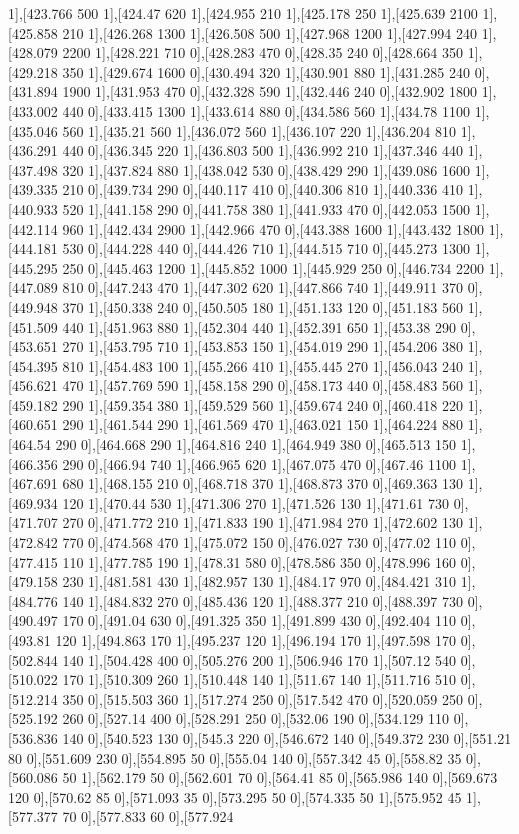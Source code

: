 {1],[423.766 500 1],[424.47 620 1],[424.955 210 1],[425.178 250 1],[425.639 2100 1],[425.858 210 1],[426.268 1300 1],[426.508 500 1],[427.968 1200 1],[427.994 240 1],[428.079 2200 1],[428.221 710 0],[428.283 470 0],[428.35 240 0],[428.664 350 1],[429.218 350 1],[429.674 1600 0],[430.494 320 1],[430.901 880 1],[431.285 240 0],[431.894 1900 1],[431.953 470 0],[432.328 590 1],[432.446 240 0],[432.902 1800 1],[433.002 440 0],[433.415 1300 1],[433.614 880 0],[434.586 560 1],[434.78 1100 1],[435.046 560 1],[435.21 560 1],[436.072 560 1],[436.107 220 1],[436.204 810 1],[436.291 440 0],[436.345 220 1],[436.803 500 1],[436.992 210 1],[437.346 440 1],[437.498 320 1],[437.824 880 1],[438.042 530 0],[438.429 290 1],[439.086 1600 1],[439.335 210 0],[439.734 290 0],[440.117 410 0],[440.306 810 1],[440.336 410 1],[440.933 520 1],[441.158 290 0],[441.758 380 1],[441.933 470 0],[442.053 1500 1],[442.114 960 1],[442.434 2900 1],[442.966 470 0],[443.388 1600 1],[443.432 1800 1],[444.181 530 0],[444.228 440 0],[444.426 710 1],[444.515 710 0],[445.273 1300 1],[445.295 250 0],[445.463 1200 1],[445.852 1000 1],[445.929 250 0],[446.734 2200 1],[447.089 810 0],[447.243 470 1],[447.302 620 1],[447.866 740 1],[449.911 370 0],[449.948 370 1],[450.338 240 0],[450.505 180 1],[451.133 120 0],[451.183 560 1],[451.509 440 1],[451.963 880 1],[452.304 440 1],[452.391 650 1],[453.38 290 0],[453.651 270 1],[453.795 710 1],[453.853 150 1],[454.019 290 1],[454.206 380 1],[454.395 810 1],[454.483 100 1],[455.266 410 1],[455.445 270 1],[456.043 240 1],[456.621 470 1],[457.769 590 1],[458.158 290 0],[458.173 440 0],[458.483 560 1],[459.182 290 1],[459.354 380 1],[459.529 560 1],[459.674 240 0],[460.418 220 1],[460.651 290 1],[461.544 290 1],[461.569 470 1],[463.021 150 1],[464.224 880 1],[464.54 290 0],[464.668 290 1],[464.816 240 1],[464.949 380 0],[465.513 150 1],[466.356 290 0],[466.94 740 1],[466.965 620 1],[467.075 470 0],[467.46 1100 1],[467.691 680 1],[468.155 210 0],[468.718 370 1],[468.873 370 0],[469.363 130 1],[469.934 120 1],[470.44 530 1],[471.306 270 1],[471.526 130 1],[471.61 730 0],[471.707 270 0],[471.772 210 1],[471.833 190 1],[471.984 270 1],[472.602 130 1],[472.842 770 0],[474.568 470 1],[475.072 150 0],[476.027 730 0],[477.02 110 0],[477.415 110 1],[477.785 190 1],[478.31 580 0],[478.586 350 0],[478.996 160 0],[479.158 230 1],[481.581 430 1],[482.957 130 1],[484.17 970 0],[484.421 310 1],[484.776 140 1],[484.832 270 0],[485.436 120 1],[488.377 210 0],[488.397 730 0],[490.497 170 0],[491.04 630 0],[491.325 350 1],[491.899 430 0],[492.404 110 0],[493.81 120 1],[494.863 170 1],[495.237 120 1],[496.194 170 1],[497.598 170 0],[502.844 140 1],[504.428 400 0],[505.276 200 1],[506.946 170 1],[507.12 540 0],[510.022 170 1],[510.309 260 1],[510.448 140 1],[511.67 140 1],[511.716 510 0],[512.214 350 0],[515.503 360 1],[517.274 250 0],[517.542 470 0],[520.059 250 0],[525.192 260 0],[527.14 400 0],[528.291 250 0],[532.06 190 0],[534.129 110 0],[536.836 140 0],[540.523 130 0],[545.3 220 0],[546.672 140 0],[549.372 230 0],[551.21 80 0],[551.609 230 0],[554.895 50 0],[555.04 140 0],[557.342 45 0],[558.82 35 0],[560.086 50 1],[562.179 50 0],[562.601 70 0],[564.41 85 0],[565.986 140 0],[569.673 120 0],[570.62 85 0],[571.093 35 0],[573.295 50 0],[574.335 50 1],[575.952 45 1],[577.377 70 0],[577.833 60 0],[577.924 }
